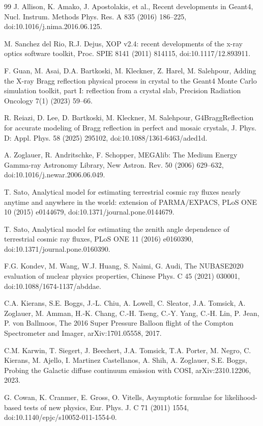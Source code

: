 \documentclass[11pt]{article}
\begin{document}
\begin{thebibliography}{99}
J. Allison, K. Amako, J. Apostolakis, et al., Recent developments in Geant4, Nucl. Instrum. Methods Phys. Res. A 835 (2016) 186--225, doi:10.1016/j.nima.2016.06.125.

M. Sanchez del Rio, R.J. Dejus, XOP v2.4: recent developments of the x-ray optics software toolkit, Proc. SPIE 8141 (2011) 814115, doi:10.1117/12.893911.

F. Guan, M. Asai, D.A. Bartkoski, M. Kleckner, Z. Harel, M. Salehpour, Adding the X-ray Bragg reflection physical process in crystal to the Geant4 Monte Carlo simulation toolkit, part I: reflection from a crystal slab, Precision Radiation Oncology 7(1) (2023) 59--66.

R. Reiazi, D. Lee, D. Bartkoski, M. Kleckner, M. Salehpour, G4BraggReflection for accurate modeling of Bragg reflection in perfect and mosaic crystals, J. Phys. D: Appl. Phys. 58 (2025) 295102, doi:10.1088/1361-6463/aded1d.

A. Zoglauer, R. Andritschke, F. Schopper, MEGAlib: The Medium Energy Gamma-ray Astronomy Library, New Astron. Rev. 50 (2006) 629--632, doi:10.1016/j.newar.2006.06.049.

T. Sato, Analytical model for estimating terrestrial cosmic ray fluxes nearly anytime and anywhere in the world: extension of PARMA/EXPACS, PLoS ONE 10 (2015) e0144679, doi:10.1371/journal.pone.0144679.

T. Sato, Analytical model for estimating the zenith angle dependence of terrestrial cosmic ray fluxes, PLoS ONE 11 (2016) e0160390, doi:10.1371/journal.pone.0160390.

F.G. Kondev, M. Wang, W.J. Huang, S. Naimi, G. Audi, The NUBASE2020 evaluation of nuclear physics properties, Chinese Phys. C 45 (2021) 030001, doi:10.1088/1674-1137/abddae.

C.A. Kierans, S.E. Boggs, J.-L. Chiu, A. Lowell, C. Sleator, J.A. Tomsick, A. Zoglauer, M. Amman, H.-K. Chang, C.-H. Tseng, C.-Y. Yang, C.-H. Lin, P. Jean, P. von Ballmoos, The 2016 Super Pressure Balloon flight of the Compton Spectrometer and Imager, arXiv:1701.05558, 2017.

C.M. Karwin, T. Siegert, J. Beechert, J.A. Tomsick, T.A. Porter, M. Negro, C. Kierans, M. Ajello, I. Martinez Castellanos, A. Shih, A. Zoglauer, S.E. Boggs, Probing the Galactic diffuse continuum emission with COSI, arXiv:2310.12206, 2023.

G. Cowan, K. Cranmer, E. Gross, O. Vitells, Asymptotic formulae for likelihood-based tests of new physics, Eur. Phys. J. C 71 (2011) 1554, doi:10.1140/epjc/s10052-011-1554-0.

\end{thebibliography}
\end{document}
